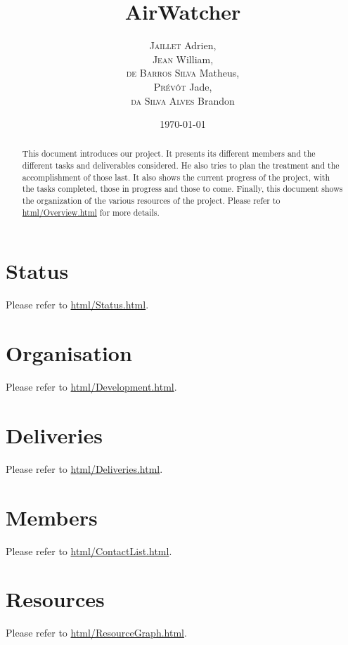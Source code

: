 \documentclass{article}
\title{AirWatcher}
\author{\textsc{Jaillet} Adrien,\\
		\textsc{Jean} William,\\
		\textsc{de Barros Silva} Matheus,\\
		\textsc{Prévôt} Jade,\\
		\textsc{da Silva Alves} Brandon}
\date{\today}
\begin{document}
	\maketitle
	\begin{abstract}
		This document introduces our project. It presents its different members
		and the different tasks and deliverables considered. He also tries to
		plan the treatment and the accomplishment of those last. It also shows
		the current progress of the project, with the tasks completed, those in
		progress and those to come. Finally, this document shows the organization
		of the various resources of the project. Please refer to
		\href{https://sevla8.github.io/airwatcher.github.io/Overview.html}{html/Overview.html} for more details.
	\end{abstract}
	\section*{Status}
		Please refer to \href{https://sevla8.github.io/airwatcher.github.io/Status.html}{html/Status.html}.
	\section*{Organisation}
		Please refer to \href{https://sevla8.github.io/airwatcher.github.io/Development.html}{html/Development.html}.
	\section*{Deliveries}
		Please refer to \href{https://sevla8.github.io/airwatcher.github.io/Deliveries.html}{html/Deliveries.html}.
	\section*{Members}
		Please refer to \href{https://sevla8.github.io/airwatcher.github.io/ContactList.html}{html/ContactList.html}.
	\section*{Resources}
		Please refer to \href{https://sevla8.github.io/airwatcher.github.io/ResourceGraph.html}{html/ResourceGraph.html}.
\end{document}
